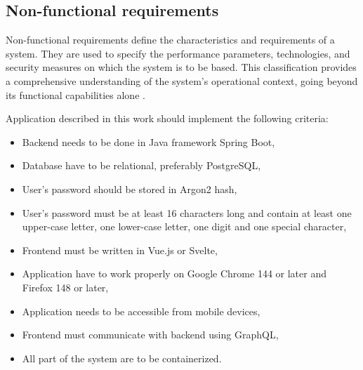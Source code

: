 \subsection{Non-functional requirements}

Non-functional requirements define the characteristics and requirements of a system. They are used to specify the performance parameters, technologies, and security measures on which the system is to be based. This classification provides a comprehensive understanding of the system’s operational context, going beyond its functional capabilities alone \cite{nonfunctional}.

Application described in this work should implement the following criteria:
\begin{itemize}
	\item Backend needs to be done in Java framework Spring Boot,
	\item Database have to be relational, preferably PostgreSQL,
	\item User's password should be stored in Argon2 hash,
	\item User's password must be at least 16 characters long and contain at least one upper-case letter, one lower-case letter, one digit and one special character,
	\item Frontend must be written in Vue.js or Svelte,
	\item Application have to work properly on Google Chrome 144 or later and Firefox 148 or later,
	\item Application needs to be accessible from mobile devices,
	\item Frontend must communicate with backend using GraphQL,
	\item All part of the system are to be containerized.
\end{itemize}